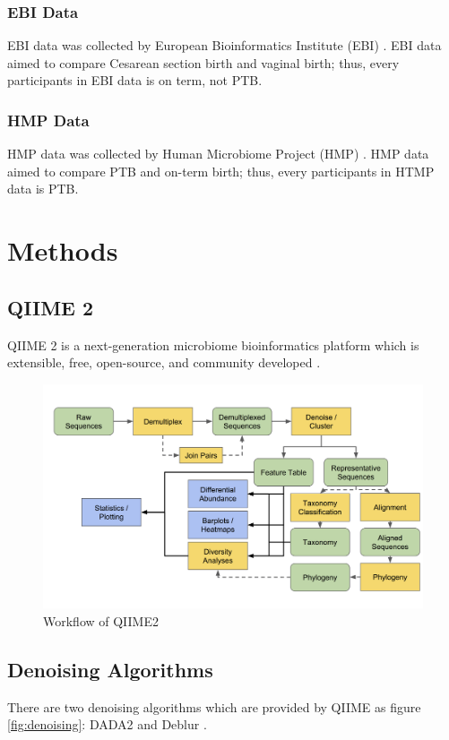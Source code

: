 \documentclass[a4paper]{article}
\begin{document}
            \subsubsection{EBI Data}
                EBI data was collected by European Bioinformatics Institute (EBI) \cite{validate1}. EBI data aimed to compare Cesarean section birth and vaginal birth; thus, every participants in EBI data is on term, not PTB.

            \subsubsection{HMP Data}
                HMP data was collected by Human Microbiome Project (HMP) \cite{validate2}. HMP data aimed to compare PTB and on-term birth; thus, every participants in HTMP data is PTB.
    \section{Methods}
        \subsection{QIIME 2}
            QIIME 2 is a next-generation microbiome bioinformatics platform which is extensible, free, open-source, and community developed \cite{qiime1, qiime2, qiime3}.

            \begin{figure}[p]
                \centering
                \includegraphics[width=0.6 \linewidth]{figures/qiime.png}
                \caption{Workflow of QIIME2}
                \label{fig:qiime2}
            \end{figure}

        \subsection{Denoising Algorithms}
            There are two denoising algorithms which are provided by QIIME as figure \ref{fig:denoising}: DADA2 \cite{DADA2} and Deblur \cite{Deblur1}.
\end{document}
